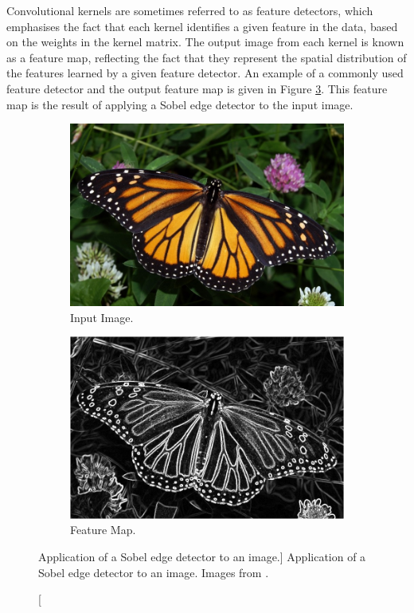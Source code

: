 Convolutional kernels are sometimes referred to as feature detectors, which 
emphasises the fact that each kernel identifies a given feature in the data, 
based on the weights in the kernel matrix. The output image from each kernel 
is known as a feature map, reflecting the fact that they represent the spatial 
distribution of the features learned by a given feature detector. An example of
a commonly used feature detector and the output feature map is given in Figure
\ref{fig:edge_detector}. This feature map is the result of applying a Sobel edge
detector\cite{kanopoulos1988design} to the input image.
\begin{figure}

	\centering

	\begin{subfigure}[b]{0.49\textwidth}
		\centering
		\includegraphics[width=\textwidth]{figures/ed_input.jpg}
		\caption{Input Image.}
		\label{fig:ed_input}
	\end{subfigure}
	\hfill
	\begin{subfigure}[b]{0.49\textwidth}
		\centering
		\includegraphics[width=\textwidth]{figures/ed_feature_map.jpg}
		\caption{Feature Map.}
		\label{fig:ed_feature_map}
	\end{subfigure}

	\caption
	[Application of a Sobel edge detector to an image.]
	{Application of a Sobel edge detector to an image. Images from
	\cite{edge_detector}.}

	\label{fig:edge_detector}

\end{figure}

